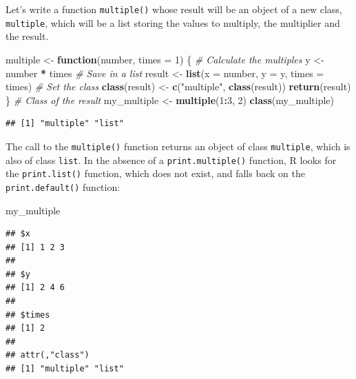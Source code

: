 \documentclass[
  12pt,
  american,
  a4paper,
  extrafontsizes,onecolumn,openright
  ]{memoir}
\newenvironment{Shaded}{\begin{snugshade}}{\end{snugshade}}
\newcommand{\AttributeTok}[1]{\textcolor[rgb]{0.13,0.29,0.53}{#1}}
\newcommand{\CommentTok}[1]{\textcolor[rgb]{0.56,0.35,0.01}{\textit{#1}}}
\newcommand{\ControlFlowTok}[1]{\textcolor[rgb]{0.13,0.29,0.53}{\textbf{#1}}}
\newcommand{\DecValTok}[1]{\textcolor[rgb]{0.00,0.00,0.81}{#1}}
\newcommand{\FunctionTok}[1]{\textcolor[rgb]{0.13,0.29,0.53}{\textbf{#1}}}
\newcommand{\NormalTok}[1]{#1}
\newcommand{\OtherTok}[1]{\textcolor[rgb]{0.56,0.35,0.01}{#1}}
\newcommand{\SpecialCharTok}[1]{\textcolor[rgb]{0.81,0.36,0.00}{\textbf{#1}}}
\newcommand{\StringTok}[1]{\textcolor[rgb]{0.31,0.60,0.02}{#1}}
\begin{document}
Let's write a function \texttt{multiple()} whose result will be an object of a new class, \texttt{multiple}, which will be a list storing the values to multiply, the multiplier and the result.

\scriptsize

\begin{Shaded}
\begin{Highlighting}[]
\NormalTok{multiple }\OtherTok{\textless{}{-}} \ControlFlowTok{function}\NormalTok{(number, }\AttributeTok{times =} \DecValTok{1}\NormalTok{) \{}
  \CommentTok{\# Calculate the multiples}
\NormalTok{  y }\OtherTok{\textless{}{-}}\NormalTok{ number }\SpecialCharTok{*}\NormalTok{ times}
  \CommentTok{\# Save in a list}
\NormalTok{  result }\OtherTok{\textless{}{-}} \FunctionTok{list}\NormalTok{(}\AttributeTok{x =}\NormalTok{ number, }\AttributeTok{y =}\NormalTok{ y, }\AttributeTok{times =}\NormalTok{ times)}
  \CommentTok{\# Set the class}
  \FunctionTok{class}\NormalTok{(result) }\OtherTok{\textless{}{-}} \FunctionTok{c}\NormalTok{(}\StringTok{"multiple"}\NormalTok{, }\FunctionTok{class}\NormalTok{(result))}
  \FunctionTok{return}\NormalTok{(result)}
\NormalTok{\}}
\CommentTok{\# Class of the result}
\NormalTok{my\_multiple }\OtherTok{\textless{}{-}} \FunctionTok{multiple}\NormalTok{(}\DecValTok{1}\SpecialCharTok{:}\DecValTok{3}\NormalTok{, }\DecValTok{2}\NormalTok{)}
\FunctionTok{class}\NormalTok{(my\_multiple)}
\end{Highlighting}
\end{Shaded}

\begin{verbatim}
## [1] "multiple" "list"
\end{verbatim}

\normalsize

The call to the \texttt{multiple()} function returns an object of class \texttt{multiple}, which is also of class \texttt{list}.
In the absence of a \texttt{print.multiple()} function, R looks for the \texttt{print.list()} function, which does not exist, and falls back on the \texttt{print.default()} function:

\scriptsize

\begin{Shaded}
\begin{Highlighting}[]
\NormalTok{my\_multiple}
\end{Highlighting}
\end{Shaded}

\begin{verbatim}
## $x
## [1] 1 2 3
## 
## $y
## [1] 2 4 6
## 
## $times
## [1] 2
## 
## attr(,"class")
## [1] "multiple" "list"
\end{verbatim}
\end{document}
